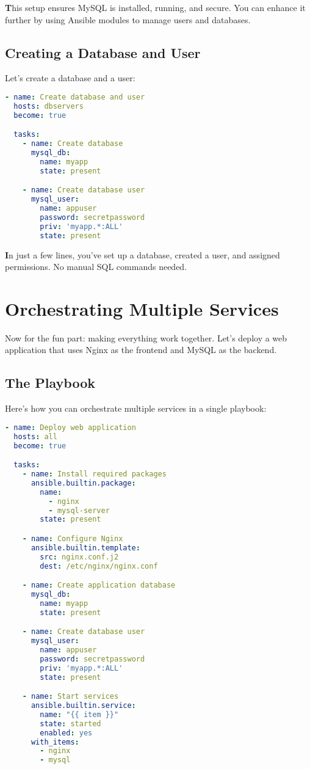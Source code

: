 \textbf{T}his setup ensures MySQL is installed, running, and secure. You can enhance it further by using Ansible modules to manage users and databases.

\subsection{Creating a Database and User}

Let's create a database and a user:
\begin{lstlisting}[language=yaml, caption=Create Database and User]
- name: Create database and user
  hosts: dbservers
  become: true

  tasks:
    - name: Create database
      mysql_db:
        name: myapp
        state: present

    - name: Create database user
      mysql_user:
        name: appuser
        password: secretpassword
        priv: 'myapp.*:ALL'
        state: present
\end{lstlisting}

\textbf{I}n just a few lines, you've set up a database, created a user, and assigned permissions. No manual SQL commands needed.


\section{Orchestrating Multiple Services}

Now for the fun part: making everything work together. Let's deploy a web application that uses Nginx as the frontend and MySQL as the backend.

\subsection{The Playbook}

Here's how you can orchestrate multiple services in a single playbook:
\begin{lstlisting}[language=yaml, caption=Orchestrating Web and Database Services]
- name: Deploy web application
  hosts: all
  become: true

  tasks:
    - name: Install required packages
      ansible.builtin.package:
        name:
          - nginx
          - mysql-server
        state: present

    - name: Configure Nginx
      ansible.builtin.template:
        src: nginx.conf.j2
        dest: /etc/nginx/nginx.conf

    - name: Create application database
      mysql_db:
        name: myapp
        state: present

    - name: Create database user
      mysql_user:
        name: appuser
        password: secretpassword
        priv: 'myapp.*:ALL'
        state: present

    - name: Start services
      ansible.builtin.service:
        name: "{{ item }}"
        state: started
        enabled: yes
      with_items:
        - nginx
        - mysql
\end{lstlisting}

